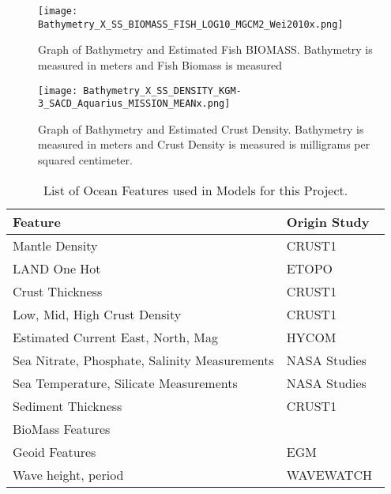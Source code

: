 \begin{figure}[htp]
    \centering
    \texttt{[image: Bathymetry\_X\_SS\_BIOMASS\_FISH\_LOG10\_MGCM2\_Wei2010x.png]}
    \caption{Graph of Bathymetry and Estimated Fish BIOMASS. Bathymetry is measured in meters and Fish Biomass is measured }
    \label{fig:bathyxfish}
\end{figure}

\begin{figure}[htp]
    \centering
    \texttt{[image: Bathymetry\_X\_SS\_DENSITY\_KGM-3\_SACD\_Aquarius\_MISSION\_MEANx.png]}
    \caption{Graph of Bathymetry and Estimated Crust Density.
    Bathymetry is measured in meters and Crust Density is measured is milligrams per squared centimeter.}
    \label{fig:bathyxdensity}
\end{figure}

%

\begin{table}[htp]
    \centering
    \begin{tabular}{ |p{} p{}| }
        \hline
            \textbf{Feature} & \textbf{Origin Study} \\
            \hline
            Mantle Density & CRUST1~\cite{laske2013update} \\
            LAND One Hot & ETOPO~\cite{national1988etopo} \\
            Crust Thickness & CRUST1~\cite{laske2013update} \\
            Low, Mid, High Crust Density & CRUST1~\cite{laske2013update} \\
            Estimated Current East, North, Mag & HYCOM~\cite{chassignet2009us} \\
            Sea Nitrate, Phosphate, Salinity Measurements & NASA Studies~\cite{meissner2018salinity,parekh2005decoupling}  \\
            Sea Temperature, Silicate Measurements & NASA Studies \\
            Sediment Thickness & CRUST1~\cite{laske2013update} \\
            BioMass Features &~\cite{wei2010global} \\
            Geoid Features & EGM~\cite{pavlis2008earth} \\
            Wave height, period & WAVEWATCH~\cite{tolman20072007} \\
        \hline
    \end{tabular}
    \label{table:FEATURE_LIST}
    \caption{List of Ocean Features used in Models for this Project.}
\end{table}
